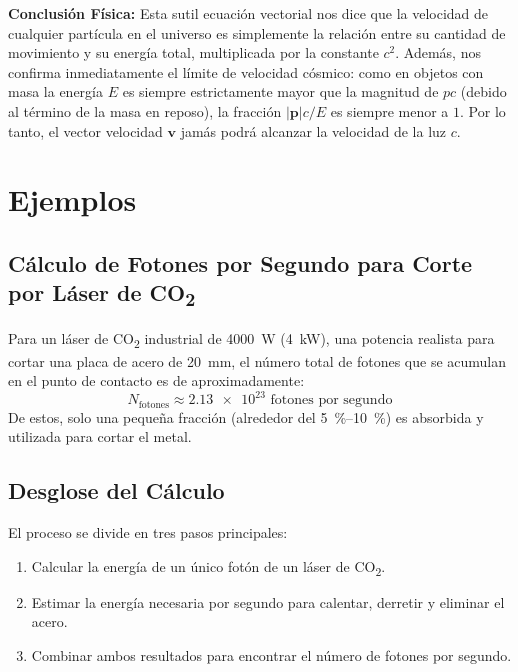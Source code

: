 \documentclass[11pt,a4paper]{book}
\begin{document}
\textbf{Conclusión Física:}
Esta sutil ecuación vectorial nos dice que la velocidad de cualquier partícula en el universo es simplemente la relación entre su cantidad de movimiento y su energía total, multiplicada por la constante $c^2$. 
Además, nos confirma inmediatamente el límite de velocidad cósmico: como en objetos con masa la energía $E$ es siempre estrictamente mayor que la magnitud de $pc$ (debido al término de la masa en reposo), la fracción $|\boldsymbol{p}|c/E$ es siempre menor a $1$. Por lo tanto, el vector velocidad $\boldsymbol{v}$ jamás podrá alcanzar la velocidad de la luz $c$.


    
\section{Ejemplos}

\subsection{ Cálculo de Fotones por Segundo para Corte por Láser de CO\textsubscript{2}}

Para un láser de CO\textsubscript{2} industrial de \SI{4000}{\watt} (\SI{4}{kW}), una potencia realista para cortar una placa de acero de \SI{20}{\milli\meter}, el número total de fotones que se acumulan en el punto de contacto es de aproximadamente:
\[ \boxed{N_{\text{fotones}} \approx \num{2.13e23} \text{ fotones por segundo}} \]
De estos, solo una pequeña fracción (alrededor del \SIrange{5}{10}{\percent}) es absorbida y utilizada para cortar el metal.

\subsection*{Desglose del Cálculo}
El proceso se divide en tres pasos principales:
\begin{enumerate}
    \item Calcular la energía de un único fotón de un láser de CO\textsubscript{2}.
    \item Estimar la energía necesaria por segundo para calentar, derretir y eliminar el acero.
    \item Combinar ambos resultados para encontrar el número de fotones por segundo.
\end{enumerate}
\end{document}
